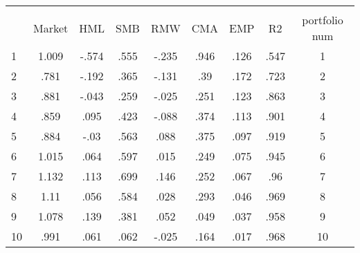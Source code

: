 {
\def\sym#1{\ifmmode^{#1}\else\(^{#1}\)\fi}
\begin{tabular}{l*{1}{cccccccc}}
\hline\hline
            &\multicolumn{8}{c}{}                                                                                   \\
            &     Market &         HML&         SMB&         RMW&         CMA&         EMP&          R2&portfolio num\\
\hline
1           &       1.009&       -.574&        .555&       -.235&        .946&        .126&        .547&           1\\
2           &        .781&       -.192&        .365&       -.131&         .39&        .172&        .723&           2\\
3           &        .881&       -.043&        .259&       -.025&        .251&        .123&        .863&           3\\
4           &        .859&        .095&        .423&       -.088&        .374&        .113&        .901&           4\\
5           &        .884&        -.03&        .563&        .088&        .375&        .097&        .919&           5\\
6           &       1.015&        .064&        .597&        .015&        .249&        .075&        .945&           6\\
7           &       1.132&        .113&        .699&        .146&        .252&        .067&         .96&           7\\
8           &        1.11&        .056&        .584&        .028&        .293&        .046&        .969&           8\\
9           &       1.078&        .139&        .381&        .052&        .049&        .037&        .958&           9\\
10          &        .991&        .061&        .062&       -.025&        .164&        .017&        .968&          10\\
\hline\hline
\end{tabular}
}
